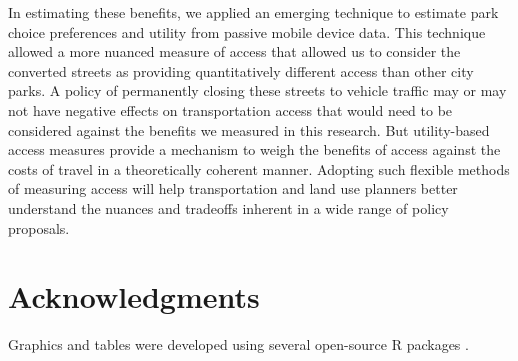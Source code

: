 \documentclass[3p, authoryear, review]{elsarticle} %
\begin{document}
In estimating these benefits, we applied an emerging technique to estimate park
choice preferences and utility from passive mobile device data. This technique
allowed a more nuanced measure of access that allowed us to consider the
converted streets as providing quantitatively different access than other city
parks. A policy of permanently closing these streets to vehicle traffic may or
may not have negative effects on transportation access that would need to be
considered against the benefits we measured in this research. But utility-based
access measures provide a mechanism to weigh the benefits of access against the
costs of travel in a theoretically coherent manner. Adopting such flexible
methods of measuring access will help transportation and land use planners
better understand the nuances and tradeoffs inherent in a wide range of policy
proposals.

\hypertarget{acknowledgments}{%
\section*{Acknowledgments}\label{acknowledgments}}

Graphics and tables were developed using several open-source R packages
\citep{ggmap, modelsummary, wesanderson}.


\end{document}

